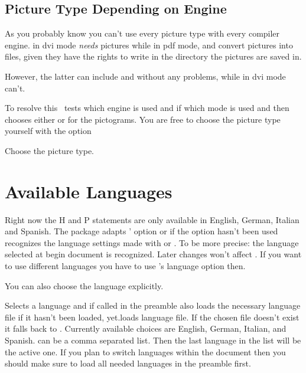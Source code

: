 \documentclass[load-preamble+]{cnltx-doc}
\begin{document}
\subsection{Picture Type Depending on Engine}\label{ssec:picture_type}
As you probably know you can't use every picture type with every compiler
engine.  \pdfTeX{} in \acs{dvi} mode \emph{needs}  pictures while
\pdfTeX{} in \acs{pdf} mode, \XeTeX{} and \LuaTeX{} convert 
pictures into  files, given they have the rights to write in the
directory the pictures are saved in.

However, the latter can include  and  without any
problems, while \pdfTeX{} in \acs{dvi} mode can't.

To resolve this \ghsystem\ tests which engine is used and if \pdfTeX{} which
mode is used and then chooses either  or  for the
pictograms.  You are free to choose the picture type yourself with the option
\begin{options}
    Choose the picture type.
\end{options}

\section{Available Languages}\label{sec:ghsystem_language}
Right now the H and P statements are only available in English, German,
Italian and Spanish.  The package adapts ' option
 or if the option hasn't been used recognizes the language
settings made with  or .  To be more precise: the
language selected at begin document is recognized.  Later changes won't affect
\ghsystem.  If you want to use different languages you have to use \ghsystem's
language option then.

You can also choose the language explicitly.
\begin{options}
    Selects a language and if called in the preamble also
    loads the necessary language file if it hasn't been loaded, yet.loads
    language file.  If the chosen file doesn't exist it falls back to
    .  Currently available choices are English, German, Italian,
    and Spanish.   can be a comma separated list.  Then the last
    language in the list will be the active one.  If you plan to switch
    languages within the document then you should make sure to load all needed
    languages in the preamble first.
\end{options}
\begin{example}

\end{example}
\end{document}
